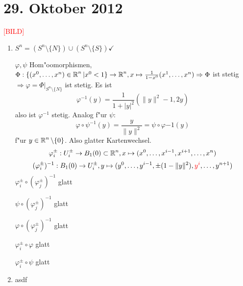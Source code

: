 \section{29. Oktober 2012}
\setcounter{Aufg}{0} %
\setcounter{Loes}{0}

\begin{Loes}
\textcolor{red}{[BILD]}
\begin{enumerate}[label=\alph*),leftmargin=*,widest=a,font=\normalfont]
\item
	$S^n = (S^n \setminus \{N\}) \cup (S^n\setminus \{S\}) \checkmark$
	
	$\varphi, \psi$ Hom"oomorphismen, $\Phi: \{(x^0,\ldots ,x^n) \in \operatorname{\mathbb{R}}^n | x^0 < 1\} \to \operatorname{\mathbb{R}}^n, x \mapsto \frac{1}{1-x^0}(x^1, \ldots ,x^n) \Rightarrow \Phi$ ist stetig $\Rightarrow  \varphi = \Phi|_{S^n \setminus \{N\}}$ ist stetig. Es ist
		\[ \varphi^{-1}(y) = \frac{1}{1+|y|^2}(\|y\|^2 - 1, 2y)\]
	also ist $\varphi^{-1}$ stetig. Analog f"ur $\psi$:
		\[\varphi \circ \psi^{-1}(y) = \frac{y}{\|y\|^2} = \psi \circ \varphi{-1}(y) \]
	f"ur $y \in \operatorname{\mathbb{R}}^n \setminus \{0\}$. Also glatter Kartenwechsel.\marginnote{\textcolor{red}{[BILD]}}
		\[ \varphi_i^\pm: U_i^\pm \to B_1(0) \subset \operatorname{\mathbb{R}}^n, x \mapsto (x^0,\ldots ,x^{i-1}, x^{i+1},\ldots ,x^n) \]
		\[ (\varphi_i^\pm)^{-1}: B_1(0) \to U_i^\pm, y \mapsto (y^0,\ldots ,y^{i-1}, \pm (1 - \|y\|^2), \textcolor{red}{y^i},\ldots ,y^{n+1}) \]
	$\varphi_i^\pm \circ (\varphi_j^\pm)^{-1}$ glatt
	
	$\psi \circ (\varphi_j^\pm)^{-1}$ glatt
	
	$\varphi \circ (\varphi_j^\pm)^{-1}$ glatt
	
	$\varphi_i^\pm \circ \varphi$ glatt
	
	$\varphi_i^\pm \circ \psi$ glatt
\item
	asdf
\end{enumerate}
\end{Loes}

